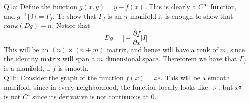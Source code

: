 \documentclass[letterpaper]{article}
\DeclareMathOperator{\R}{\mathbb{R}}
\newcommand{\bd}{\partial}
\begin{document}
\noindent Q1a: Define the function $g(x,y)=y-f(x)$. This is clearly a $C^\infty$ function, and $g^{-1}\{0\} =\Gamma_f$. To show that $\Gamma_f$ is an $n$ manifold it is enough to show that $rank(Dg)=n$. Notice that $$Dg = \Big[-\frac{\bd f}{\bd x} | I \Big]$$ This will be an $(n)\times (n+m)$ matrix, and hence will have a rank of $m$, since the identity matrix will span a $m$ dimensional space. Thereforem we have that $\Gamma_f$ is a manifold, if $f$ is smooth. 
\newline \\ Q1b: Consider the graph of the function $f(x) = x^{\frac{1}{3}}$. This will be a smooth manifold, since in every neighborhood, the function locally looks like $\R$, but $x^\frac{1}{3}$ is not $C^1$ since its derivative is not continuous at $0$.  
\end{document}

